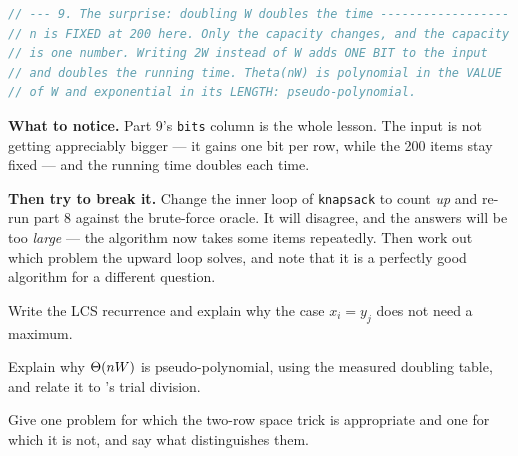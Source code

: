 \begin{lab}
\begin{lstlisting}[language=C++]
// --- 9. The surprise: doubling W doubles the time ------------------
// n is FIXED at 200 here. Only the capacity changes, and the capacity
// is one number. Writing 2W instead of W adds ONE BIT to the input
// and doubles the running time. Theta(nW) is polynomial in the VALUE
// of W and exponential in its LENGTH: pseudo-polynomial.
\end{lstlisting}

\textbf{What to notice.} Part 9's \texttt{bits} column is the whole lesson. The
input is not getting appreciably bigger --- it gains one bit per row, while the
200 items stay fixed --- and the running time doubles each time.

\smallskip
\textbf{Then try to break it.} Change the inner loop of \texttt{knapsack} to
count \emph{up} and re-run part 8 against the brute-force oracle. It will
disagree, and the answers will be too \emph{large} --- the algorithm now takes
some items repeatedly. Then work out which problem the upward loop solves, and
note that it is a perfectly good algorithm for a different question.
\end{lab}

\begin{checkpoint}
\begin{tightnum}
  \item Write the LCS recurrence and explain why the case $x_{i} = y_{j}$ does
        not need a maximum.
  \item Explain why $\Theta(nW)$ is pseudo-polynomial, using the measured
        doubling table, and relate it to 's trial division.
  \item Give one problem for which the two-row space trick is appropriate and
        one for which it is not, and say what distinguishes them.
\end{tightnum}
\end{checkpoint}

